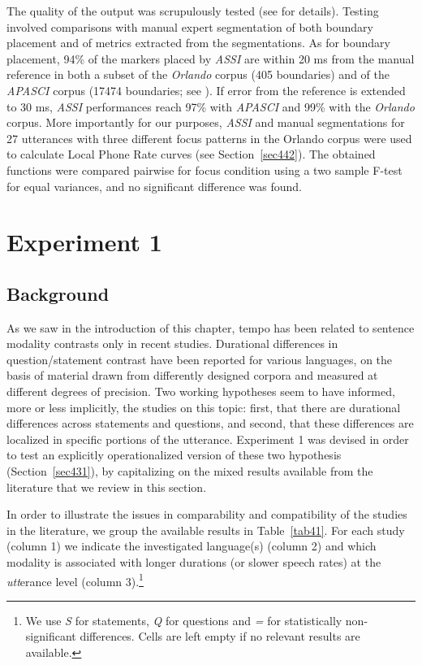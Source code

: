 The quality of the output was scrupulously tested (see \citealt{cangemi2011automatic} for details). Testing involved comparisons with manual expert segmentation of both boundary placement and of metrics extracted from the segmentations. As for boundary placement, 94\% of the markers placed by \textit{ASSI} are within 20 ms from the manual reference in both a subset of the \textit{Orlando} corpus (405 boundaries) and  of the \textit{APASCI} corpus (17474 boundaries; see \citealt{angelini1993baseline}). If error from the reference is extended to 30 ms, \textit{ASSI} performances reach 97\% with \textit{APASCI} and 99\% with the \textit{Orlando} corpus. More importantly for our purposes, \textit{ASSI} and manual segmentations for 27 utterances with three different focus patterns in the Orlando corpus were used to calculate Local Phone Rate curves (see Section~\ref{sec442}). The obtained functions were compared pairwise for focus condition using a two sample F-test for equal variances, and no significant difference was found.

\section{Experiment 1}\label{sec43}
\subsection{Background}\label{sec430}
As we saw in the introduction of this chapter, tempo has been related to sentence modality contrasts only in recent studies. Durational differences in question/statement contrast have been reported for various languages, on the basis of material drawn from differently designed corpora and measured at different degrees of precision. Two working hypotheses seem to have informed, more or less implicitly, the studies on this topic: first, that there are durational differences across statements and questions, and second, that these differences are localized in specific portions of the utterance. Experiment 1 was devised in order to test an explicitly operationalized version of these two hypothesis (Section~\ref{sec431}), by capitalizing on the mixed results available from the literature that we review in this section.

In order to illustrate the issues in comparability and compatibility of the studies in the literature, we group the available results in Table~\ref{tab41}. For each study (column 1) we indicate the investigated language(s) (column 2) and which modality is associated with longer durations (or slower speech rates) at the \textit{utt}erance level (column 3).\footnote{We use \textit{S} for statements, \textit{Q} for questions and \textit{=} for statistically non-significant differences. Cells are left empty if no relevant results are available.} 

